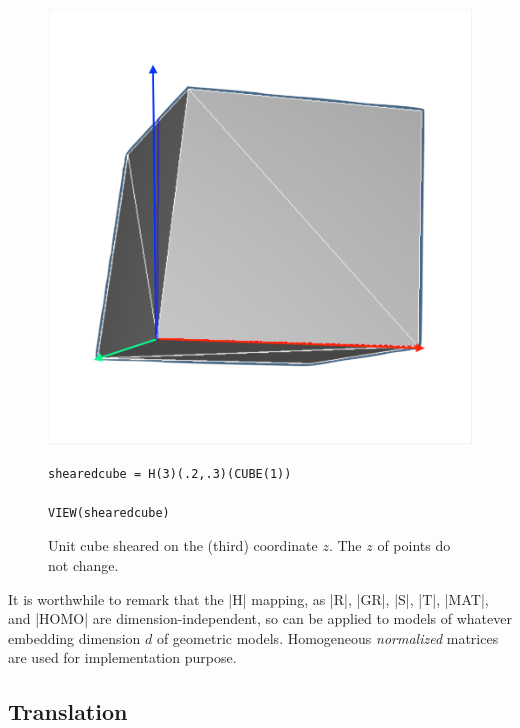 \begin{coding}
\begin{figure}[htbp] %
\begin{minipage}[c]{0.35\textwidth}
   \includegraphics[width=\linewidth]{chapter-04/figs/shear3D} 
\end{minipage}\hfill
\begin{minipage}[c]{0.60\textwidth}
\begin{lstlisting}[language=JuliaLocal, style=julia, mathescape=false]
shearedcube = H(3)(.2,.3)(CUBE(1))

VIEW(shearedcube)
\end{lstlisting}
   \caption{Unit cube sheared on the (third) coordinate $z$. The $z$ of points do not change.}
\end{minipage}
\end{figure}

It is worthwhile to remark that the |H| mapping, as |R|, |GR|, |S|, |T|, |MAT|, and |HOMO| are dimension-independent, so can be applied to models of whatever embedding dimension $d$ of geometric models. Homogeneous \emph{normalized} matrices are used for implementation purpose. 


 
\subsection*{Translation}
\label{subsec:2:translation}


\end{coding}
